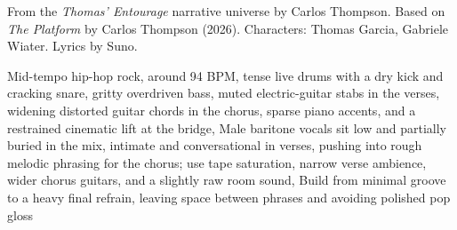 
\begin{notes}
From the \emph{Thomas’ Entourage} narrative universe by Carlos Thompson. Based on \emph{The Platform} by Carlos Thompson (2026). Characters: Thomas Garcia, Gabriele Wiater. Lyrics by Suno.
\end{notes}
\begin{style}
Mid-tempo hip-hop rock, around 94 BPM, tense live drums with a dry kick and cracking snare, gritty overdriven bass, muted electric-guitar stabs in the verses, widening distorted guitar chords in the chorus, sparse piano accents, and a restrained cinematic lift at the bridge, Male baritone vocals sit low and partially buried in the mix, intimate and conversational in verses, pushing into rough melodic phrasing for the chorus; use tape saturation, narrow verse ambience, wider chorus guitars, and a slightly raw room sound, Build from minimal groove to a heavy final refrain, leaving space between phrases and avoiding polished pop gloss
\end{style}
